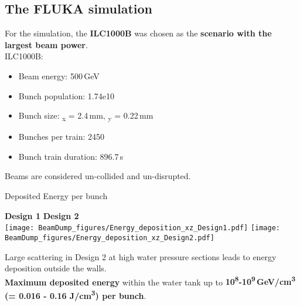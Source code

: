 \documentclass[xcolor={dvipsnames}]{beamer}
\begin{document}
\subsection{The FLUKA simulation}
\begin{frame}
For the simulation, the \textbf{ILC1000B} was chosen as the \textbf{scenario with the largest beam power}.\\
\vspace*{0.5cm}
 ILC1000B:
 \begin{itemize}
  \item Beam energy: 500\,GeV
  \item Bunch population: 1.74e10
  \item Bunch size: \textsigma\textsubscript{x} = 2.4\,mm, \textsigma\textsubscript{y} = 0.22\,mm
  \item Bunches per train: 2450
  \item Bunch train duration: 896.7\,\textmu s
 \end{itemize}
\vspace*{0.2cm}
Beams are considered un-collided and un-disrupted.
\end{frame}

\begin{frame}{Deposited Energy per bunch}
\begin{center}
\hspace*{1.7cm} \textbf{Design 1} \hfill \textbf{Design 2} \hspace*{1.8cm} \\
  \texttt{[image: BeamDump\_figures/Energy\_deposition\_xz\_Design1.pdf]}
    \texttt{[image: BeamDump\_figures/Energy\_deposition\_xz\_Design2.pdf]}
\end{center}
 Large scattering in Design 2 at high water pressure sections leads to energy deposition outside the walls.\\
  \textbf{Maximum deposited energy} within the water tank up to \textbf{10\textsuperscript{8}-10\textsuperscript{9}\,GeV/cm\textsuperscript{3} (= 0.016 - 0.16 J/cm\textsuperscript{3}) per bunch}.
\end{frame}
\end{document}

